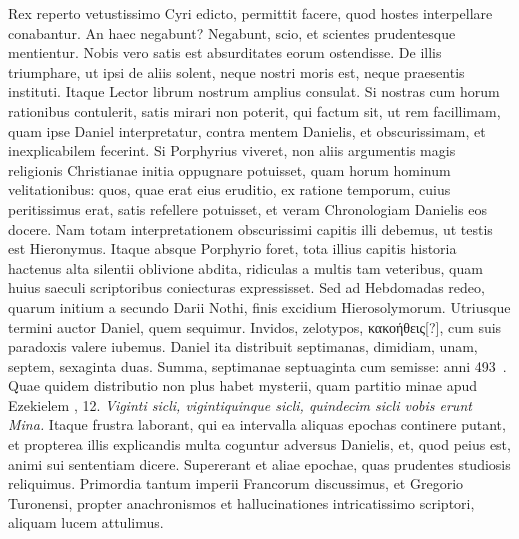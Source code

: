 Rex reperto vetustissimo Cyri edicto, permittit facere,
quod hostes interpellare conabantur.
An haec negabunt?
Negabunt, scio, et scientes prudentesque mentientur.
Nobis vero satis
est absurditates eorum ostendisse.
De illis triumphare, ut ipsi de
aliis solent, neque nostri moris est, neque praesentis instituti.
Itaque
Lector  librum nostrum amplius consulat.
%
Si nostras cum horum
rationibus contulerit, satis mirari non poterit, qui factum
sit, ut rem facillimam, quam ipse Daniel interpretatur, contra mentem
Danielis, et obscurissimam, et inexplicabilem fecerint.
Si Porphyrius
viveret, non aliis argumentis magis religionis Christianae
initia oppugnare potuisset, quam horum hominum velitationibus:
quos, quae erat eius eruditio, ex ratione temporum, cuius peritissimus
erat, satis refellere potuisset, et veram Chronologiam
Danielis eos docere.
Nam totam interpretationem obscurissimi
capitis  illi debemus, ut testis est Hieronymus.
Itaque
absque Porphyrio foret, tota illius capitis historia hactenus alta
silentii oblivione abdita, ridiculas a multis tam veteribus, quam huius
saeculi scriptoribus coniecturas expressisset.
Sed ad Hebdomadas
redeo, quarum initium a secundo Darii Nothi, finis excidium
Hierosolymorum.
Utriusque termini auctor Daniel, quem sequimur.
Invidos, zelotypos, \textgreek{κακοήθεις[?]}, cum suis
 paradoxis valere iubemus.
Daniel ita distribuit septimanas, dimidiam, unam, septem,
sexaginta duas.
Summa, septimanae septuaginta cum semisse: anni
493~.
Quae quidem distributio non plus habet mysterii, quam
partitio minae apud Ezekielem , 12.
\textit{Viginti sicli, vigintiquinque
sicli, quindecim sicli vobis erunt Mina.}
Itaque frustra laborant,
qui ea intervalla aliquas epochas continere putant, et propterea
illis explicandis multa coguntur adversus Danielis, et, quod peius
est, animi sui sententiam dicere.
Supererant et aliae epochae, quas
prudentes studiosis reliquimus.
Primordia tantum imperii Francorum
discussimus, et Gregorio Turonensi, propter anachronismos
et hallucinationes intricatissimo scriptori, aliquam lucem attulimus.
